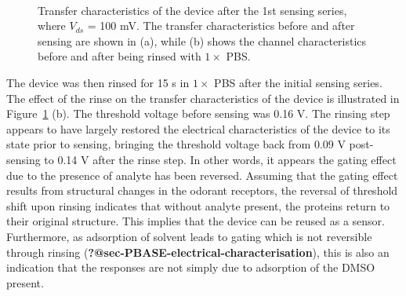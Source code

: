 \documentclass[
  a4paper,
]{scrbook}
\begin{document}
\begin{figure}
\begin{minipage}[t]{0.46\linewidth}
{{}

}

\end{minipage}%
%
\begin{minipage}[t]{0.01\linewidth}

{\centering 

~

}

\end{minipage}%

\caption{\label{fig-OR10a-TX-1}Transfer characteristics of the device
after the 1st sensing series, where \(V_{ds}\) = 100 mV. The transfer
characteristics before and after sensing are shown in (a), while (b)
shows the channel characteristics before and after being rinsed with
\(1 \times\) PBS.}

\end{figure}

The device was then rinsed for 15 s in \(1 \times\) PBS after the
initial sensing series. The effect of the rinse on the transfer
characteristics of the device is illustrated in
Figure~\ref{fig-OR10a-TX-1} (b). The threshold voltage before sensing
was 0.16 V. The rinsing step appears to have largely restored the
electrical characteristics of the device to its state prior to sensing,
bringing the threshold voltage back from 0.09 V post-sensing to 0.14 V
after the rinse step. In other words, it appears the gating effect due
to the presence of analyte has been reversed. Assuming that the gating
effect results from structural changes in the odorant receptors, the
reversal of threshold shift upon rinsing indicates that without analyte
present, the proteins return to their original structure. This implies
that the device can be reused as a sensor. Furthermore, as adsorption of
solvent leads to gating which is not reversible through rinsing
(\textbf{?@sec-PBASE-electrical-characterisation}), this is also an
indication that the responses are not simply due to adsorption of the
DMSO present.
\end{document}

